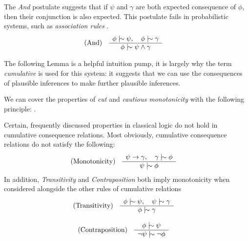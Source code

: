 The \textit{And} postulate suggests that if $\psi$ and $\gamma$ are both expected consequence of $\phi$, then their
conjunction is also expected. This postulate fails in probabilistic systems, such as \textit{association rules} \cite{gabbay1985theoreticalFoundations}.
\begin{align}
	\label{postulate:and}\inferLeft{And}{\phi \twiddle \psi, \quad \phi \twiddle \gamma}{\phi \twiddle \psi \land \gamma}
\end{align}

The following Lemma is a helpful intuition pump, it is largely why the term \textit{cumulative} is used for this system:
it suggests that we can use the consequences of plausible inferences to make further plausible inferences.
\begin{lemma}
	\label{lemma:cut-cautious} We can cover the properties of \emph{cut} and \emph{cautious monotonicity} with the following
	principle: .
\end{lemma}

Certain, frequently discussed properties in classical logic do not hold in cumulative consequence relations. Most
obviously, cumulative consequence relations do not satisfy the following:
%
\begin{align}
	\label{postulate:monotonicity}\inferLeft{Monotonicity}{\psi \rightarrow \gamma, \quad \gamma \twiddle \phi}{\psi \twiddle \phi}
\end{align}
%
In addition, \textit{Transitivity} and \textit{Contraposition} both imply monotonicity when considered alongside the other
rules of cumulative relations
%
\begin{align}
	\label{postulate:trans}\inferLeft{Transitivity}{\phi \twiddle \psi, \quad \psi \twiddle \gamma}{\phi \twiddle \gamma}
\end{align}

\begin{align}
	\label{postulate:contra}\inferLeft{Contraposition}{\phi \twiddle \psi}{\neg \psi \twiddle \neg \phi}
\end{align}

